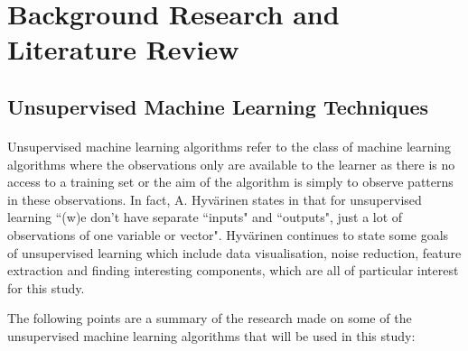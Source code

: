 \documentclass[12pt, twoside]{report}
\begin{document}
	
	\section{Background Research and Literature Review}
	\subsection{Unsupervised Machine Learning Techniques}
	\paragraph{ }Unsupervised machine learning algorithms refer to the class of machine learning algorithms where the observations only are available to the learner as there is no access to a training set or the aim of the algorithm is simply to observe patterns in these observations. In fact, A. Hyv{\"a}rinen states in \cite{r:lecturenotes} that for unsupervised learning ``(w)e don't have separate ``inputs" and ``outputs", just a lot of observations of one variable or vector". Hyv{\"a}rinen continues to state some goals of unsupervised learning which include data visualisation, noise reduction, feature extraction and finding interesting components, which are all of particular interest for this study.
	\par The following points are a summary of the research made on some of the unsupervised machine learning algorithms that will be used in this study:
\end{document}
